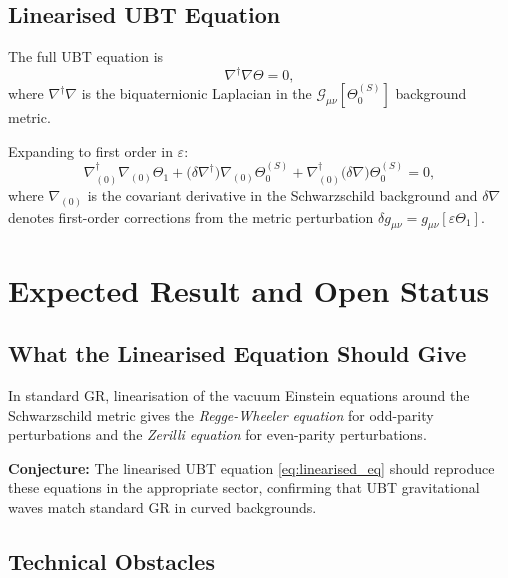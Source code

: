 \documentclass[12pt]{article}
\theoremstyle{definition}
\theoremstyle{remark}
\begin{document}
\subsection{Linearised UBT Equation}

The full UBT equation is
\begin{equation}
  \nabla^\dagger\nabla\Theta = 0,
  \label{eq:ubt_eq}
\end{equation}
where $\nabla^\dagger\nabla$ is the biquaternionic Laplacian in the
$\mathcal{G}_{\mu\nu}[\Theta_0^{(S)}]$ background metric.

Expanding to first order in $\varepsilon$:
\begin{equation}
  \nabla^\dagger_{(0)}\nabla_{(0)}\Theta_1
  + \bigl(\delta\nabla^\dagger\bigr)\nabla_{(0)}\Theta_0^{(S)}
  + \nabla^\dagger_{(0)}\bigl(\delta\nabla\bigr)\Theta_0^{(S)}
  = 0,
  \label{eq:linearised_eq}
\end{equation}
where $\nabla_{(0)}$ is the covariant derivative in the Schwarzschild
background and $\delta\nabla$ denotes first-order corrections from
the metric perturbation $\delta g_{\mu\nu} = g_{\mu\nu}[\varepsilon\Theta_1]$.

\section{Expected Result and Open Status}
\label{sec:expected}

\subsection{What the Linearised Equation Should Give}

In standard GR, linearisation of the vacuum Einstein equations around the
Schwarzschild metric gives the \emph{Regge-Wheeler equation} for odd-parity
perturbations and the \emph{Zerilli equation} for even-parity perturbations.

\textbf{Conjecture:} The linearised UBT equation \eqref{eq:linearised_eq}
should reproduce these equations in the appropriate sector, confirming
that UBT gravitational waves match standard GR in curved backgrounds.

\subsection{Technical Obstacles}
\end{document}
